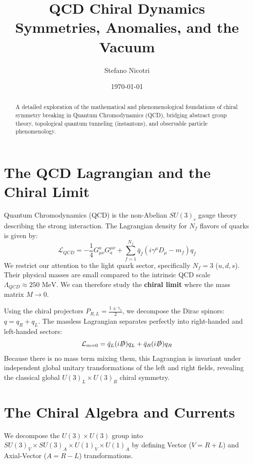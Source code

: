 \documentclass[12pt, a4paper]{article}
\title{\textbf{QCD Chiral Dynamics}\\ \Large Symmetries, Anomalies, and the Vacuum}
\author{Stefano Nicotri}
\date{\today}
\begin{document}
\maketitle

\begin{abstract}
\noindent A detailed exploration of the mathematical and phenomenological foundations of chiral symmetry breaking in Quantum Chromodynamics (QCD), bridging abstract group theory, topological quantum tunneling (instantons), and observable particle phenomenology.
\end{abstract}

\tableofcontents
\newpage

\section{The QCD Lagrangian and the Chiral Limit}

Quantum Chromodynamics (QCD) is the non-Abelian $SU(3)_c$ gauge theory describing the strong interaction. The Lagrangian density for $N_f$ flavors of quarks is given by:
\[
\mathcal{L}_{QCD} = -\frac{1}{4}G_{\mu\nu}^a G^{\mu\nu}_a + \sum_{f=1}^{N_f} \bar{q}_f (i\gamma^\mu D_{\mu} - m_f) q_f
\]
We restrict our attention to the light quark sector, specifically $N_f = 3$ ($u, d, s$). Their physical masses are small compared to the intrinsic QCD scale $\Lambda_{QCD} \approx 250 \text{ MeV}$. We can therefore study the \textbf{chiral limit} where the mass matrix $M \to 0$.

Using the chiral projectors $P_{R,L} = \frac{1 \pm \gamma_5}{2}$, we decompose the Dirac spinors: $q = q_R + q_L$. The massless Lagrangian separates perfectly into right-handed and left-handed sectors:
\[
\mathcal{L}_{m=0} = \bar{q}_L (i\slashed{D}) q_L + \bar{q}_R (i\slashed{D}) q_R
\]
Because there is no mass term mixing them, this Lagrangian is invariant under independent global unitary transformations of the left and right fields, revealing the classical global $U(3)_L \times U(3)_R$ chiral symmetry.

\section{The Chiral Algebra and Currents}

We decompose the $U(3) \times U(3)$ group into $SU(3)_V \times SU(3)_A \times U(1)_V \times U(1)_A$ by defining Vector ($V = R + L$) and Axial-Vector ($A = R - L$) transformations.
\end{document}
